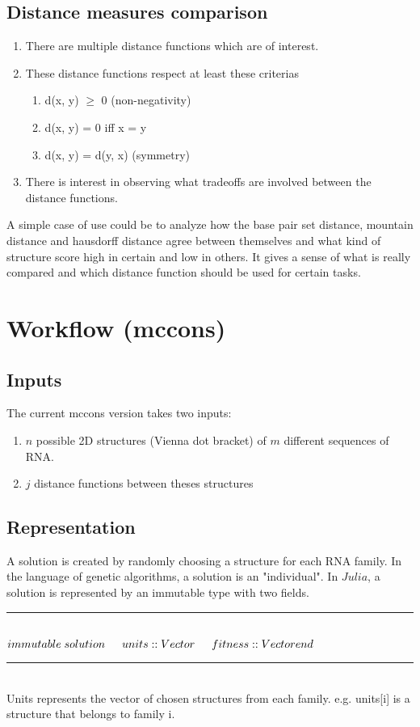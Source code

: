 \documentclass[a4paper, 12pt] {article}
\newcommand{\HRule}{\rule{\linewidth}{0.5mm}}
\begin{document}
\subsection*{Distance measures comparison}
\begin{enumerate}
  \item There are multiple distance functions which are of interest.
  \item These distance functions respect at least these criterias
    \begin{enumerate}
      \item d(x, y) $\geq$ 0 (non-negativity)
      \item d(x, y) = 0 iff x = y 
      \item d(x, y) = d(y, x) (symmetry)
    \end{enumerate}
  \item There is interest in observing what tradeoffs are involved between the distance functions.
\end{enumerate}
A simple case of use could be to analyze how the base pair set distance, mountain distance and hausdorff distance
agree between themselves and what kind of structure score high in certain and low in others. It gives a sense
of what is really compared and which distance function should be used for certain tasks.\\

\noindent
\section*{Workflow (mccons)}
\subsection*{Inputs}
\noindent
The current mccons version takes two inputs:

\begin{enumerate}
  \item $n$ possible 2D structures (Vienna dot bracket) of $m$ different sequences of RNA.
  \item $j$ distance functions between theses structures
\end{enumerate}
\noindent

\subsection*{Representation}
A solution is created by randomly choosing a structure for each RNA family. In the language of
genetic algorithms, a solution is an "individual".
In $Julia$, a solution is represented by an immutable type with two fields.
\HRule \\[0.4cm]
\begin{math}
\noindent
immutable \; solution\\
\indent units::Vector\\
\indent fitness::Vector\\
end\\
\noindent
\end{math}
\HRule \\[0.4cm]
Units represents the vector of chosen structures from each family.
e.g. units[i] is a structure that belongs to family i.
\end{document}
